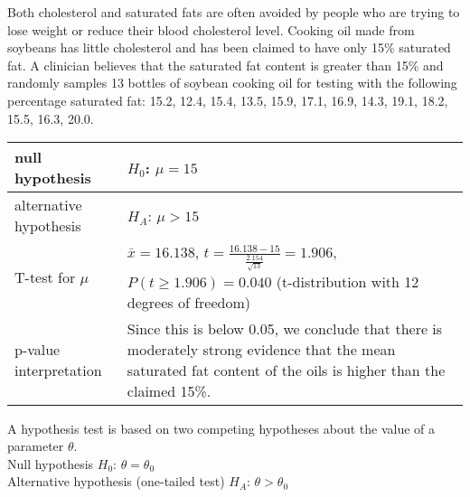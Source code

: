 \begin{example}
    Both cholesterol and saturated fats are often avoided by people who are trying to lose weight or reduce their blood cholesterol level. Cooking oil made from soybeans has little cholesterol and has been claimed to have only 15\% saturated fat. A clinician believes that the saturated fat content is greater than 15\% and randomly samples 13 bottles of soybean cooking oil for testing with the following percentage saturated fat: 15.2, 12.4, 15.4, 13.5, 15.9, 17.1, 16.9, 14.3, 19.1, 18.2, 15.5, 16.3, 20.0.
    \begin{center}
       \begin{tabular}{p{4cm}|p{7cm}}
            null hypothesis & $H_0$: $\mu=15$ \\
            \hline
            alternative hypothesis & $H_A$: $\mu > 15$ \\
            \hline
            T-test for $\mu$ & $\bar{x} = 16.138$, $t=\frac{16.138-15}{\frac{2.154}{\sqrt{13}}} = 1.906$, $P(t\ge 1.906) = 0.040$ (t-distribution with 12 degrees of freedom) \\
            \hline
            p-value interpretation & Since this is below 0.05, we conclude that there is moderately strong evidence that the mean saturated fat content of the oils is higher than the claimed 15\%.
       \end{tabular}
    \end{center}
	\begin{center}
	\end{center}
\end{example}

A hypothesis test is based on two competing hypotheses about the value of a parameter $\theta$. \\
Null hypothesis $H_0$: $\theta = \theta_0$ \\
Alternative hypothesis (one-tailed test) $H_A$: $\theta > \theta_0$

